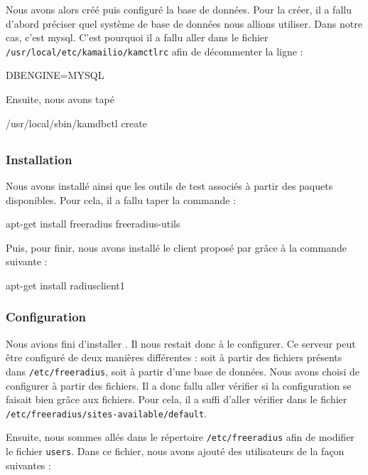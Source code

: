 Nous avons alors créé puis configuré la base de données. Pour la créer, il a fallu d'abord préciser quel système de base de données nous allions utiliser.
Dans notre cas, c'est mysql. C'est pourquoi il a fallu aller dans le fichier \texttt{/usr/local/etc/kamailio/kamctlrc} afin de décommenter la ligne :

\begin{kamcf}
DBENGINE=MYSQL
\end{kamcf}

Ensuite, nous avons tapé 
\begin{shellcode}
/usr/local/sbin/kamdbctl create
\end{shellcode}
\todo

\subsection{\frad}
\subsubsection{Installation}

Nous avons installé {\frad} ainsi que les outils de test associés à partir des paquets disponibles. Pour cela, il a fallu taper la commande :

\begin{shellcode}
apt-get install freeradius freeradius-utils
\end{shellcode}

Puis, pour finir, nous avons installé le client {\rad} proposé par {\frad} grâce à la commande suivante :

\begin{shellcode}
apt-get install radiusclient1
\end{shellcode}

\subsubsection{Configuration}
Nous avions fini d'installer {\frad}. Il nous restait donc à le configurer. Ce serveur {\rad} peut être configuré de deux manières différentes : soit à partir des fichiers présents dans \texttt{/etc/freeradius}, soit à partir d'une base de données. Nous avons choisi de configurer à partir des fichiers. Il a donc fallu aller vérifier si la configuration se faisait bien grâce aux fichiers. Pour cela, il a suffi d'aller vérifier dans le fichier \texttt{/etc/freeradius/sites-available/default}.

Ensuite, nous sommes allés dans le répertoire \texttt{/etc/freeradius} afin de modifier le fichier \texttt{users}. Dans ce fichier, nous avons ajouté des utilisateurs de la façon suivantes :


